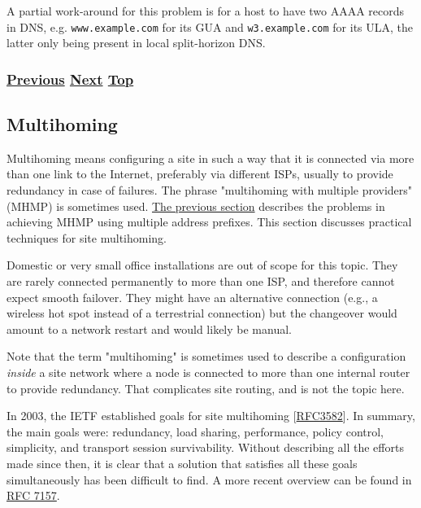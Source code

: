 \documentclass[
]{article}
\begin{document}
A partial work-around for this problem is for a host to have two AAAA
records in DNS, e.g. \texttt{www.example.com} for its GUA and
\texttt{w3.example.com} for its ULA, the latter only being present in
local split-horizon DNS.

\subsubsection{\texorpdfstring{\hyperref[security-operation]{Previous}
\hyperref[multihoming]{Next}
\hyperref[management-and-operations]{Top}}{Previous Next Top}}\label{previous-next-top-31}

\pagebreak

\subsection{Multihoming}\label{multihoming}

Multihoming means configuring a site in such a way that it is connected
via more than one link to the Internet, preferably via different ISPs,
usually to provide redundancy in case of failures. The phrase
"multihoming with multiple providers" (MHMP) is sometimes used.
\hyperref[multi-prefix-operation]{The previous section} describes the
problems in achieving MHMP using multiple address prefixes. This section
discusses practical techniques for site multihoming.

Domestic or very small office installations are out of scope for this
topic. They are rarely connected permanently to more than one ISP, and
therefore cannot expect smooth failover. They might have an alternative
connection (e.g., a wireless hot spot instead of a terrestrial
connection) but the changeover would amount to a network restart and
would likely be manual.

Note that the term "multihoming" is sometimes used to describe a
configuration \emph{inside} a site network where a node is connected to
more than one internal router to provide redundancy. That complicates
site routing, and is not the topic here.

In 2003, the IETF established goals for site multihoming
{[}\href{https://www.rfc-editor.org/info/rfc3582}{RFC3582}{]}. In
summary, the main goals were: redundancy, load sharing, performance,
policy control, simplicity, and transport session survivability. Without
describing all the efforts made since then, it is clear that a solution
that satisfies all these goals simultaneously has been difficult to
find. A more recent overview can be found in
\href{https://www.rfc-editor.org/info/rfc7157}{RFC 7157}.
\end{document}
